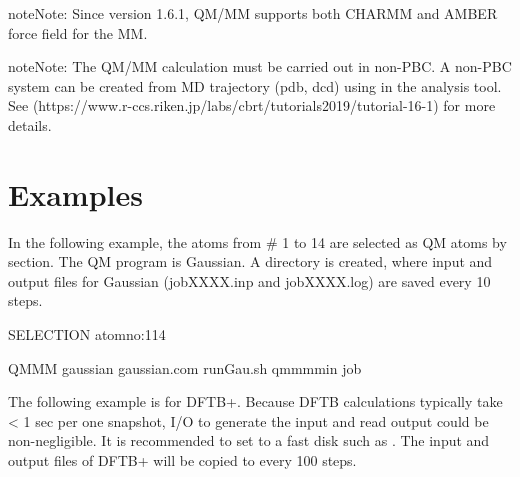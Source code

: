 \documentclass[a4paper,11pt,oneside,english]{sphinxmanual}
\begin{document}
\begin{sphinxadmonition}{note}{Note:}
Since version 1.6.1, QM/MM supports both CHARMM and AMBER force field for
the MM.
\end{sphinxadmonition}

\begin{sphinxadmonition}{note}{Note:}
The QM/MM calculation must be carried out in non-PBC. A non-PBC system
can be created from MD trajectory (pdb, dcd) using  in
the analysis tool.
See  (https://www.r-ccs.riken.jp/labs/cbrt/tutorials2019/tutorial-16-1)
for more details.
\end{sphinxadmonition}


\section{Examples}
\label{\detokenize{17_QMMM:examples}}
In the following example, the atoms from \# 1 to 14 are selected as QM
atoms by \sphinxstylestrong{{[}SELECTION{]}} section. The QM program is Gaussian. A
directory  is created, where input and output files for
Gaussian (jobXXXX.inp and jobXXXX.log) are saved every 10 steps.

\begin{sphinxVerbatim}[commandchars=\\\{\}]
\PYG{o}{[}SELECTION\PYG{o}{]}
   atomno:1\PYGZhy{}14

\PYG{o}{[}QMMM\PYG{o}{]}
   
                gaussian
                gaussian.com
                runGau.sh
              qmmm\PYGZus{}min
             job
        
\end{sphinxVerbatim}

The following example is for DFTB+. Because DFTB calculations
typically take \textless{} 1 sec per one snapshot, I/O to generate the
input and read output could be non-negligible.  It is
recommended to set  to a fast disk such as
.  The input and output files of DFTB+ will be
copied to  every 100 steps.
\end{document}
